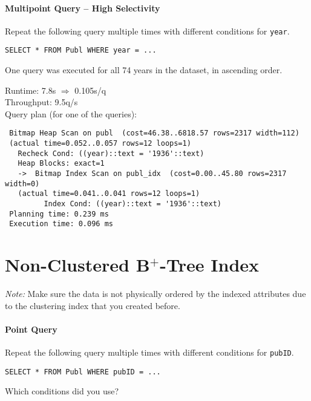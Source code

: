 \documentclass[11pt]{scrartcl}
\begin{document}
\paragraph{Multipoint Query -- High Selectivity}

Repeat the following query multiple times with different conditions for {\tt year}.

{\small
\begin{verbatim}
SELECT * FROM Publ WHERE year = ...
\end{verbatim}
}

\noindent
\newcommand{\condC}{
One query was executed for all 74 years in the dataset, in ascending order.
}
\condC

\smallskip\noindent
Runtime: 7.8s $\Rightarrow$ 0.105s/q\\
Throughput: 9.5q/s\\

\smallskip\noindent
Query plan (for one of the queries):
{\small
\begin{verbatim}
 Bitmap Heap Scan on publ  (cost=46.38..6818.57 rows=2317 width=112)
 (actual time=0.052..0.057 rows=12 loops=1)
   Recheck Cond: ((year)::text = '1936'::text)
   Heap Blocks: exact=1
   ->  Bitmap Index Scan on publ_idx  (cost=0.00..45.80 rows=2317 width=0)
   (actual time=0.041..0.041 rows=12 loops=1)
         Index Cond: ((year)::text = '1936'::text)
 Planning time: 0.239 ms
 Execution time: 0.096 ms
\end{verbatim}
}

\section{Non-Clustered B$^+$-Tree Index}

\noindent \emph{Note:} Make sure the data is not physically ordered by
the indexed attributes due to the clustering index that you created
before.

\paragraph{Point Query}

Repeat the following query multiple times with different conditions for {\tt pubID}.

{\small
\begin{verbatim}
SELECT * FROM Publ WHERE pubID = ...
\end{verbatim}
}

\noindent
Which conditions did you use?\\
\condA
\end{document}
